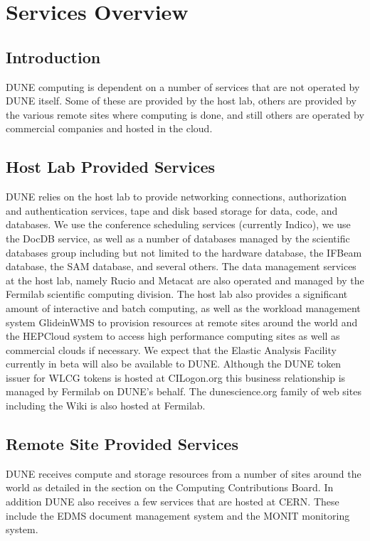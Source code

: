 \documentclass[../main-v1.tex]{subfiles}
\begin{document}
\chapter{Services Overview }
\label{ch:serv}

\section{Introduction}
DUNE computing is dependent on a number of services that are not operated by DUNE itself.
Some of these are provided by the host lab, others are provided by the various remote sites where
computing is done, and still others are operated by commercial companies and hosted in the cloud.

\section{Host Lab Provided Services}
DUNE relies on the host lab to provide networking connections, authorization and authentication services, tape and disk based storage for data, code, and databases.  We use the conference scheduling services (currently Indico), we use the DocDB service,
as well as a number of databases managed by the scientific databases group including but not limited to the hardware database,
the IFBeam database, the SAM database, and several others.  The data management services at the host lab, namely Rucio and Metacat are also operated and managed by the Fermilab scientific computing division.  
The host lab also provides a significant amount of interactive and batch computing, as well as the workload management
system GlideinWMS to provision resources at remote sites around the world and the HEPCloud system to access high performance computing sites as well as commercial clouds if necessary.
We expect that the Elastic Analysis Facility currently in beta will also be available to DUNE.
Although the DUNE token issuer for WLCG tokens is hosted at CILogon.org this business relationship is managed by Fermilab
on DUNE's behalf.
The dunescience.org family of web sites including the Wiki is also hosted at Fermilab.
\section{Remote Site Provided Services}
DUNE receives compute and storage resources from a number of sites around the world as detailed in the section on the Computing Contributions Board. In addition DUNE also receives a few services that are hosted at CERN.  These include the EDMS document
management system and  the MONIT monitoring system. 
\end{document}
